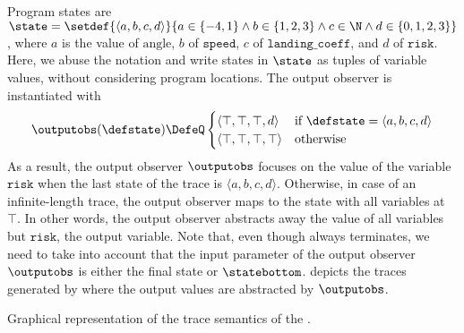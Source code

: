 \begin{example}
  Program states are $\state=\setdef{\langle a, b, c, d \rangle}{a\in\{-4,1\}\land b\in\{1,2,3\}\land c\in\N \land d\in\{0,1,2,3\}}$, where $a$ is the value of $\text{angle}$, $b$ of $\texttt{speed}$, $c$ of $\texttt{landing\_coeff}$, and $d$ of $\texttt{risk}$.
  Here, we abuse the notation and write states in $\state$ as tuples of variable values, without considering program locations.
  The output observer is instantiated with
  \[
  \outputobs(\defstate) \DefeQ \begin{cases}
    \langle \top, \top, \top, d \rangle & \text{if } \defstate = \langle a, b, c, d \rangle \\
    \langle \top, \top, \top, \top \rangle & \text{otherwise}
  \end{cases}
  \]
  As a result, the output observer $\outputobs$ focuses on the value of the variable $\texttt{risk}$ when the last state of the trace is $\langle a, b, c, d \rangle$. Otherwise, in case of an infinite-length trace, the output observer maps to the state with all variables at $\top$.
  In other words, the output observer abstracts away the value of all variables but $\texttt{risk}$, the output variable.
  Note that, even though  always terminates, we need to take into account that the input parameter of the output observer $\outputobs$ is either the final state or $\statebottom$.
   depicts the traces generated by  where the output values are abstracted by $\outputobs$.
\end{example}
\begin{marginfigure}
  \centering
\caption{Graphical representation of the trace semantics of the .}
\end{marginfigure}

